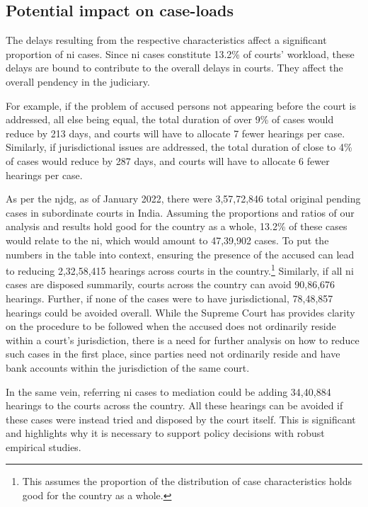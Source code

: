\subsection{Potential impact on case-loads} \label{sec:impact-case-loads}

The delays resulting from the respective characteristics affect a significant proportion of \gls{ni} cases. Since \gls{ni} cases constitute 13.2\% of courts' workload, these delays are bound to contribute to the overall delays in courts. They affect the overall pendency in the judiciary. 

For example, if the problem of accused persons not appearing before the court is addressed, all else being equal, the total duration of over 9\% of cases would reduce by 213 days, and courts will have to allocate 7 fewer hearings per case. Similarly, if jurisdictional issues are addressed, the total duration of close to 4\% of cases would reduce by 287 days, and courts will have to allocate 6 fewer hearings per case.

As per the \gls{njdg}, as of January 2022, there were 3,57,72,846 total original pending cases in subordinate courts in India. Assuming the proportions and ratios of our analysis and results hold good for the country as a whole, 13.2\% of these cases would relate to the \gls{ni}, which would amount to 47,39,902 cases. To put the numbers in the table into context, ensuring the presence of the accused can lead to reducing 2,32,58,415 hearings across courts in the country.\footnote{This assumes the proportion of the distribution of case characteristics holds good for the country as a whole.} Similarly, if all \gls{ni} cases are disposed summarily, courts across the country can avoid 90,86,676 hearings. Further, if none of the cases were to have jurisdictional, 78,48,857 hearings could be avoided overall. While the Supreme Court has provides clarity on the procedure to be followed when the accused does not ordinarily reside within a court's jurisdiction, there is a need for further analysis on how to reduce such cases in the first place, since parties need not ordinarily reside and have bank accounts within the jurisdiction of the same court.

In the same vein, referring \gls{ni} cases to mediation could be adding 34,40,884 hearings to the courts across the country. All these hearings can be avoided if these cases were instead tried and disposed by the court itself. This is significant and highlights why it is necessary to support policy decisions with robust empirical studies.



